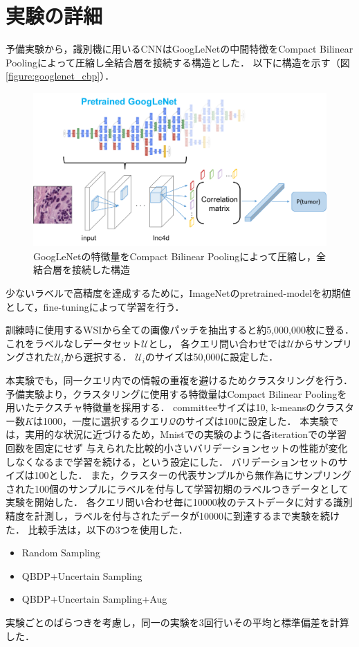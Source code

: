 \section{実験の詳細}
予備実験から，識別機に用いるCNNはGoogLeNetの中間特徴をCompact Bilinear Poolingによって圧縮し全結合層を接続する構造とした．
以下に構造を示す（図\ref{figure:googlenet_cbp}）．
\begin{figure}[tbp]
   \begin{center}
    \includegraphics[width=12cm]{figures/googlenet_cbp.pdf}
   \end{center}
  \caption{\label{fig:googlenet_cbp}GoogLeNetの特徴量をCompact Bilinear Poolingによって圧縮し，全結合層を接続した構造}
\end{figure}
少ないラベルで高精度を達成するために，ImageNetのpretrained-modelを初期値として，fine-tuningによって学習を行う．

訓練時に使用するWSIから全ての画像パッチを抽出すると約5,000,000枚に登る．これをラベルなしデータセット$\mathcal{U}$とし，
各クエリ問い合わせでは$\mathcal{U}$からサンプリングされた$\mathcal{U}_i$から選択する．
$\mathcal{U}_i$のサイズは50,000に設定した．

本実験でも，同一クエリ内での情報の重複を避けるためクラスタリングを行う．
予備実験より，クラスタリングに使用する特徴量はCompact Bilinear Poolingを用いたテクスチャ特徴量を採用する．
committeeサイズは10, k-meansのクラスター数$K$は1000，一度に選択するクエリ$\mathcal{Q}$のサイズは100に設定した．
本実験では，実用的な状況に近づけるため，Mnistでの実験のように各iterationでの学習回数を固定にせず
与えられた比較的小さいバリデーションセットの性能が変化しなくなるまで学習を続ける，という設定にした．
バリデーションセットのサイズは100とした．
また，クラスターの代表サンプルから無作為にサンプリングされた100個のサンプルにラベルを付与して学習初期のラベルつきデータとして実験を開始した．
各クエリ問い合わせ毎に10000枚のテストデータに対する識別精度を計測し，ラベルを付与されたデータが10000に到達するまで実験を続けた．
比較手法は，以下の3つを使用した．
\begin{itemize}
  \item Random Sampling
  \item QBDP+Uncertain Sampling
  \item QBDP+Uncertain Sampling+Aug
\end{itemize}
実験ごとのばらつきを考慮し，同一の実験を3回行いその平均と標準偏差を計算した．

